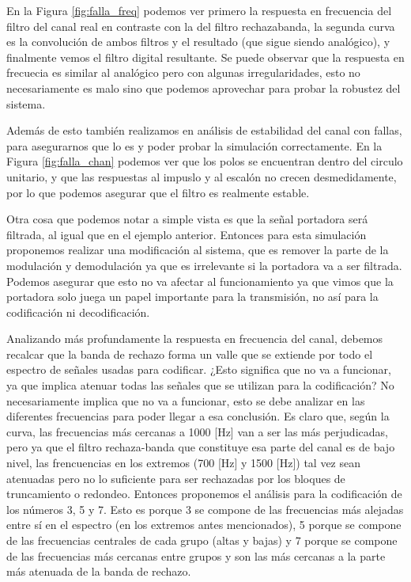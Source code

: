 En la Figura \ref{fig:falla_freq} podemos ver primero la respuesta en frecuencia del filtro del canal real en contraste con la del filtro rechazabanda, la segunda curva es la convolución de ambos filtros y el resultado (que sigue siendo analógico), y finalmente vemos el filtro digital resultante. Se puede observar que la respuesta en frecuecia es similar al analógico pero con algunas irregularidades, esto no necesariamente es malo sino que podemos aprovechar para probar la robustez del sistema.

\pagebreak

Además de esto también realizamos en análisis de estabilidad del canal con fallas, para asegurarnos que lo es y poder probar la simulación correctamente. En la Figura \ref{fig:falla_chan} podemos ver que los polos se encuentran dentro del circulo unitario, y que las respuestas al impuslo y al escalón no crecen desmedidamente, por lo que podemos asegurar que el filtro es realmente estable.

Otra cosa que podemos notar a simple vista es que la señal portadora será filtrada, al igual que en el ejemplo anterior. Entonces para esta simulación proponemos realizar una modificación al sistema, que es remover la parte de la modulación y demodulación ya que es irrelevante si la portadora va a ser filtrada. Podemos asegurar que esto no va afectar al funcionamiento ya que vimos que la portadora solo juega un papel importante para la transmisión, no así para la codificación ni decodificación.

Analizando más profundamente la respuesta en frecuencia del canal, debemos recalcar que la banda de rechazo forma un valle que se extiende por todo el espectro de señales usadas para codificar. ¿Esto significa que no va a funcionar, ya que implica atenuar todas las señales que se utilizan para la codificación? No necesariamente implica que no va a funcionar, esto se debe analizar en las diferentes frecuencias para poder llegar a esa conclusión. Es claro que, según la curva, las frecuencias más cercanas a 1000 [Hz] van a ser las más perjudicadas, pero ya que el filtro rechaza-banda que constituye esa parte del canal es de bajo nivel, las frencuencias en los extremos (700 [Hz] y 1500 [Hz]) tal vez sean atenuadas pero no lo suficiente para ser rechazadas por los bloques de truncamiento o redondeo. Entonces proponemos el análisis para la codificación de los números 3, 5 y 7. Esto es porque 3 se compone de las frecuencias más alejadas entre sí en el espectro (en los extremos antes mencionados), 5 porque se compone de las frecuencias centrales de cada grupo (altas y bajas) y 7 porque se compone de las frecuencias más cercanas entre grupos y son las más cercanas a la parte más atenuada de la banda de rechazo.

